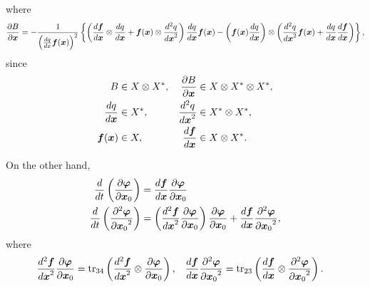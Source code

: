\documentclass[a4paper]{article}
\newcommand{\deriv}[3][1]{%
    \ifthenelse{\equal{#1}{1}}{\frac{d #2}{d #3}}{\frac{d^#1 #2}{{d #3}^#1}}
}
\newcommand{\pderiv}[3][1]{%
    \ifthenelse{\equal{#1}{1}}{\frac{\partial #2}{\partial #3}}{\frac{\partial^#1 #2}{{\partial #3}^#1}}
}
\newcommand{\parens}[1]{\left(#1\right)}
\newcommand{\tr}{\mathop{\mathrm{tr}}\nolimits}
\newcommand{\braces}[1]{\left\{#1\right\}}
\newcommand{\traj}{\bm \varphi}
\begin{document}
where
\begin{align}
    \pderiv{B}{\bm x}
    =
    - \frac{1}{
        \parens{\deriv{q}{x} \bm f(\bm x)}^2
    }
    \braces{
        \parens{
            \deriv{\bm f}{\bm x} \otimes \deriv{q}{\bm x}
            +
            \bm f(\bm x) \otimes \deriv[2]{q}{\bm x}
        }
        \deriv{q}{\bm x} \bm f(\bm x)
        -
        \parens{\bm f(\bm x) \deriv{q}{\bm x}} \otimes
        \parens{
            \deriv[2]{q}{\bm x} \bm f(\bm x)
            +
            \deriv{q}{\bm x} \deriv{\bm f}{\bm x}
        }
    },
\end{align}
since
\begin{align}
    \begin{aligned}
        B &\in X \otimes X^* ,&
        \pderiv{B}{\bm x} &\in X \otimes X^* \otimes X^*,\\
        \deriv{q}{\bm x}&\in X^*, &
        \deriv[2]{q}{\bm x} & \in X^* \otimes X^*,\\
        \bm f(\bm x) &\in X, &
        \deriv{\bm f}{\bm x} &\in X \otimes X^*.
    \end{aligned}
\end{align}

On the other hand,
\begin{align}
    \deriv{}{t}
    \parens{\pderiv{\traj}{\bm x_0}}
    &= \deriv{\bm f}{\bm x} \pderiv{\traj}{\bm x_0}\\
    \deriv{}{t}
    \parens{\pderiv[2]{\traj}{\bm x_0}}
    &=
    \parens{\deriv[2]{\bm f}{\bm x} \pderiv{\traj}{\bm x_0}}
    \pderiv{\traj}{\bm x_0}
    +
    \deriv{\bm f}{\bm x} \pderiv[2]{\traj}{\bm x_0},
\end{align}
where
\begin{align}
    \begin{aligned}
        \deriv[2]{\bm f}{\bm x} \pderiv{\traj}{\bm x_0}
        &= \tr_{34} \parens{
            \deriv[2]{\bm f}{\bm x} \otimes \pderiv{\traj}{\bm x_0}
        },
        &
        \deriv{\bm f}{\bm x} \pderiv[2]{\traj}{\bm x_0}
        &=
        \tr_{23} \parens{
            \deriv{\bm f}{\bm x} \otimes \pderiv[2]{\traj}{\bm x_0}
        }.
    \end{aligned}
\end{align}
\end{document}

